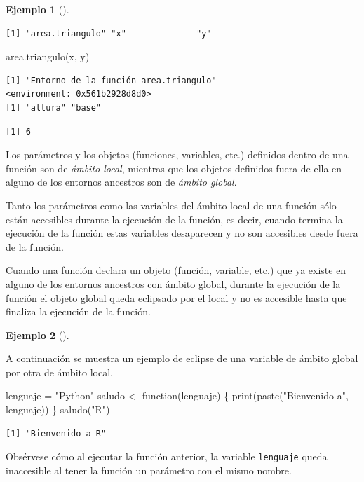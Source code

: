 \documentclass[
  a4paper,
]{scrreport}
\newenvironment{Shaded}{\begin{snugshade}}{\end{snugshade}}
\newcommand{\ControlFlowTok}[1]{\textcolor[rgb]{0.00,0.23,0.31}{#1}}
\newcommand{\FunctionTok}[1]{\textcolor[rgb]{0.28,0.35,0.67}{#1}}
\newcommand{\NormalTok}[1]{\textcolor[rgb]{0.00,0.23,0.31}{#1}}
\newcommand{\OtherTok}[1]{\textcolor[rgb]{0.00,0.23,0.31}{#1}}
\newcommand{\StringTok}[1]{\textcolor[rgb]{0.13,0.47,0.30}{#1}}
\theoremstyle{definition}
\theoremstyle{definition}
\newtheorem{example}{Ejemplo}[chapter]
\theoremstyle{remark}
\begin{document}
\begin{example}[]
\begin{verbatim}
[1] "area.triangulo" "x"              "y"             
\end{verbatim}

\begin{Shaded}
\begin{Highlighting}[]
\FunctionTok{area.triangulo}\NormalTok{(x, y)}
\end{Highlighting}
\end{Shaded}

\begin{verbatim}
[1] "Entorno de la función area.triangulo"
<environment: 0x561b2928d8d0>
[1] "altura" "base"  
\end{verbatim}

\begin{verbatim}
[1] 6
\end{verbatim}

\end{example}

Los parámetros y los objetos (funciones, variables, etc.) definidos
dentro de una función son de \emph{ámbito local}, mientras que los
objetos definidos fuera de ella en alguno de los entornos ancestros son
de \emph{ámbito global}.

Tanto los parámetros como las variables del ámbito local de una función
sólo están accesibles durante la ejecución de la función, es decir,
cuando termina la ejecución de la función estas variables desaparecen y
no son accesibles desde fuera de la función.

Cuando una función declara un objeto (función, variable, etc.) que ya
existe en alguno de los entornos ancestros con ámbito global, durante la
ejecución de la función el objeto global queda eclipsado por el local y
no es accesible hasta que finaliza la ejecución de la función.

\leavevmode{}%
\begin{example}[]\label{exm-eclise-variables-globales-por-locales}

A continuación se muestra un ejemplo de eclipse de una variable de
ámbito global por otra de ámbito local.

\begin{Shaded}
\begin{Highlighting}[]
\NormalTok{lenguaje }\OtherTok{=} \StringTok{"Python"}
\NormalTok{saludo }\OtherTok{\textless{}{-}} \ControlFlowTok{function}\NormalTok{(lenguaje) \{}
  \FunctionTok{print}\NormalTok{(}\FunctionTok{paste}\NormalTok{(}\StringTok{"Bienvenido a"}\NormalTok{, lenguaje))  }
\NormalTok{\}}
\FunctionTok{saludo}\NormalTok{(}\StringTok{"R"}\NormalTok{)}
\end{Highlighting}
\end{Shaded}

\begin{verbatim}
[1] "Bienvenido a R"
\end{verbatim}

Obsérvese cómo al ejecutar la función anterior, la variable
\texttt{lenguaje} queda inaccesible al tener la función un parámetro con
el mismo nombre.

\end{example}
\end{document}
